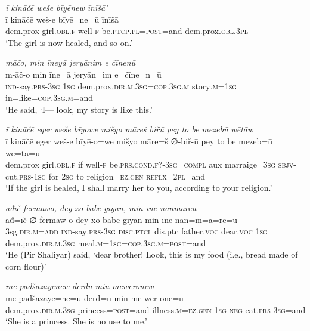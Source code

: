 \ea \label{ZP.91}
\textit{ī kināčē weše bīyēnew īnīšā’} \\ 
\gll ī kināčē weš-e bīyē=ne=ū īnīšā \\ 
 dem.prox girl\textsc{.obl}\textsc{.f} well\textsc{-f} be\textsc{.ptcp}\textsc{.pl}\textsc{=\textsc{post}}=and dem.prox\textsc{.obl}\textsc{.3pl} \\ 
\glt `The girl is now healed, and so on.'
\z 
 
\ea \label{ZP.98}
\textit{māčo, min īneyā jeryānim e čīnenū} \\ 
\gll m-āč-o min īne=ā jeryān=im e=čīne=n=ū \\ 
 \textsc{ind-}say\textsc{.prs}\textsc{-3sg} \textsc{1sg} dem.prox\textsc{.dir}\textsc{.m}\textsc{.3sg}\textsc{=cop}\textsc{.3sg}\textsc{.m} story\textsc{.m}\textsc{=\textsc{1sg}} in=like\textsc{=cop}\textsc{.3sg}\textsc{.m}=and \\ 
\glt `He said, ‘I— look, my story is like this.'
\z 
 
\ea \label{ZP.100}
\textit{ī kināčē eger weše bīyowe mišyo māreš biřū pey to be mezebū wētāw} \\ 
\gll ī kināčē eger weš-e bīyē-o=we mišyo māre=š ∅-biř-ū pey to be mezeb=ū wē=tā=ū \\ 
 dem.prox girl\textsc{.obl}\textsc{.f} if well\textsc{-f} be\textsc{.prs}.\textsc{cond}\textsc{.f}?\textsc{-3sg}\textsc{=compl} aux marraige\textsc{=3sg} \textsc{sbjv-}cut\textsc{.prs}\textsc{-\textsc{1sg}} for \textsc{2sg} to religion\textsc{\textsc{=ez.gen}} \textsc{reflx}=\textsc{2pl}=and \\ 
\glt `If the girl is healed, I shall marry her to you, according to your religion.'
\z 
 
\ea \label{ZP.101}
\textit{āđīč fermāwo, dey xo bābe gīyān, min īne nānmārēū} \\ 
\gll āđ=īč ∅-fermāw-o dey xo bābe gīyān min īne nān=m=ā=rē=ū \\ 
 3sg\textsc{.dir}\textsc{.m}\textsc{=add} \textsc{ind-}say\textsc{.prs}\textsc{-3sg} \textsc{disc.ptcl} dis.ptc father.\textsc{voc} dear.\textsc{voc} \textsc{1sg} dem.prox\textsc{.dir}\textsc{.m}\textsc{.3sg} meal\textsc{.m}\textsc{=\textsc{1sg}}\textsc{=cop}\textsc{.3sg}\textsc{.m}\textsc{=\textsc{post}}=and \\ 
\glt `He (Pir Shaliyar) said, ‘dear brother! Look, this is my food (i.e., bread made of corn flour)'
\z 
 
\ea \label{ZP.102}
\textit{īne pādšāzāyēnew derdū min meweronew} \\ 
\gll īne pādšāzāyē=ne=ū derd=ū min me-wer-one=ū \\ 
 dem.prox\textsc{.dir}\textsc{.m}\textsc{.3sg} princess\textsc{=\textsc{post}}=and illness\textsc{.m}\textsc{\textsc{=ez.gen}} \textsc{1sg} \textsc{neg-}eat\textsc{.prs}\textsc{-3sg}=and \\ 
\glt `She is a princess. She is no use to me.'
\z 
 
